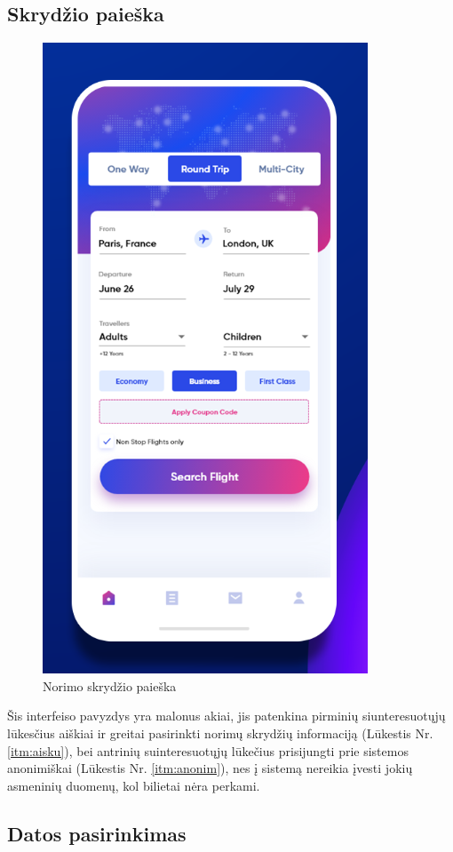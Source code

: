 \documentclass{VUMIFPSkursinis}
\begin{document}
\subsection{Skrydžio paieška}
\begin{figure}[H]
    \centering
    \includegraphics[scale=0.8]{img/info.png}
    \caption{Norimo skrydžio paieška}
    \label{img:info1}
\end{figure}
Šis interfeiso pavyzdys yra malonus akiai, jis patenkina pirminių siunteresuotųjų lūkesčius aiškiai ir greitai pasirinkti norimų skrydžių informaciją (Lūkestis Nr. \ref{itm:aisku}), bei antrinių suinteresuotųjų lūkečius prisijungti prie sistemos anonimiškai (Lūkestis Nr. \ref{itm:anonim}), nes į sistemą nereikia įvesti jokių asmeninių duomenų, kol bilietai nėra perkami.

\subsection{Datos pasirinkimas}
\end{document}
